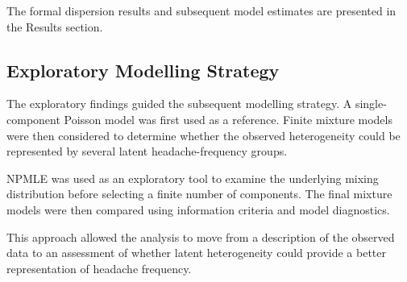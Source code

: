 The formal dispersion results and subsequent model estimates are presented in the Results section.

\subsection{Exploratory Modelling Strategy}
The exploratory findings guided the subsequent modelling strategy. A single-component Poisson model was first used as a reference. Finite mixture models were then considered to determine whether the observed heterogeneity could be represented by several latent headache-frequency groups.

NPMLE was used as an exploratory tool to examine the underlying mixing distribution before selecting a finite number of components. The final mixture models were then compared using information criteria and model diagnostics.

This approach allowed the analysis to move from a description of the observed data to an assessment of whether latent heterogeneity could provide a better representation of headache frequency.
